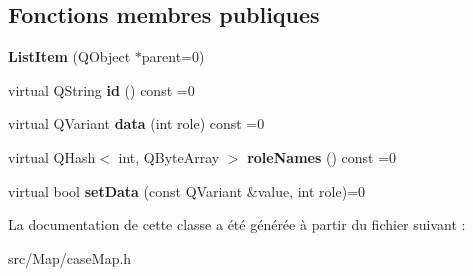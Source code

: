 \subsection*{Fonctions membres publiques}
\begin{DoxyCompactItemize}
\item 
{\bfseries List\+Item} (Q\+Object $\ast$parent=0)\hypertarget{class_list_item_af22aad420e541c1b2ba1bb52e19923fb}{}\label{class_list_item_af22aad420e541c1b2ba1bb52e19923fb}

\item 
virtual Q\+String {\bfseries id} () const  =0\hypertarget{class_list_item_a2bd93b8512b15679bc70d0025458c71c}{}\label{class_list_item_a2bd93b8512b15679bc70d0025458c71c}

\item 
virtual Q\+Variant {\bfseries data} (int role) const  =0\hypertarget{class_list_item_a42655a12963c9fb0f8f80d524d6cafe3}{}\label{class_list_item_a42655a12963c9fb0f8f80d524d6cafe3}

\item 
virtual Q\+Hash$<$ int, Q\+Byte\+Array $>$ {\bfseries role\+Names} () const  =0\hypertarget{class_list_item_a104f771dd730c5f03aa8aa9107eb2e49}{}\label{class_list_item_a104f771dd730c5f03aa8aa9107eb2e49}

\item 
virtual bool {\bfseries set\+Data} (const Q\+Variant \&value, int role)=0\hypertarget{class_list_item_a1f474dc347b3380d5737ee593d5478f0}{}\label{class_list_item_a1f474dc347b3380d5737ee593d5478f0}

\end{DoxyCompactItemize}


La documentation de cette classe a été générée à partir du fichier suivant \+:\begin{DoxyCompactItemize}
\item 
src/\+Map/case\+Map.\+h\end{DoxyCompactItemize}
